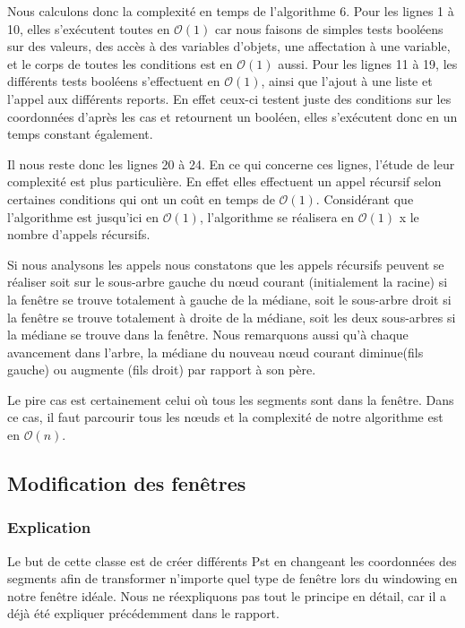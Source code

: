 \documentclass[10pt,a4paper]{article}
\begin{document}
Nous calculons donc la complexité en temps de l'algorithme 6.
Pour les lignes 1 à 10, elles s’exécutent toutes en $\mathcal{O}(1)$ car nous faisons de simples tests booléens sur des valeurs, des accès à des variables d'objets, une affectation à une variable, et le corps de toutes les conditions est en $\mathcal{O}(1)$ aussi.
Pour les lignes 11 à 19, les différents tests booléens s'effectuent en $\mathcal{O}(1)$, ainsi que l'ajout à une liste et l'appel aux différents reports. En effet ceux-ci testent juste des conditions sur les coordonnées d'après les cas et retournent un booléen, elles s’exécutent donc en un temps constant également.

Il nous reste donc les lignes 20 à 24. En ce qui concerne ces lignes, l'étude de leur complexité est plus particulière. En effet elles effectuent un appel récursif selon certaines conditions qui ont un coût en temps de $\mathcal{O}(1)$.
Considérant que l'algorithme est jusqu'ici en $\mathcal{O}(1)$, l'algorithme se réalisera en $\mathcal{O}(1)$ x le nombre d'appels récursifs.

Si nous analysons les appels nous constatons que les appels récursifs peuvent se réaliser soit sur le sous-arbre gauche du nœud courant (initialement la racine) si la fenêtre se trouve totalement à gauche de la médiane, soit le sous-arbre droit si la fenêtre se trouve totalement à droite de la médiane, soit les deux sous-arbres si la médiane se trouve dans la fenêtre. Nous remarquons aussi qu'à chaque avancement dans l'arbre, la médiane du nouveau nœud courant diminue(fils gauche) ou augmente (fils droit) par rapport à son père.

Le pire cas est certainement celui où tous les segments sont dans la fenêtre. Dans ce cas, il faut parcourir tous les nœuds et la complexité de notre algorithme est en $\mathcal{O}(n)$.

\subsection{Modification des fenêtres}

\subsubsection{Explication}
Le but de cette classe est de créer différents Pst en changeant les coordonnées des segments afin de transformer n'importe quel type de fenêtre lors du windowing en notre fenêtre idéale. Nous ne réexpliquons pas tout le principe en détail, car il a déjà été expliquer précédemment dans le rapport.
\end{document}

